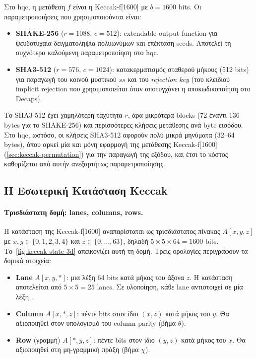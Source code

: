 Στο \gls{hqc}, η μετάθεση $f$ είναι η Keccak-f[1600] με $b = \num{1600}$ bits.
Οι παραμετροποιήσεις που χρησιμοποιούνται είναι:
\begin{itemize}
  \item \textbf{SHAKE-256} ($r = \num{1088}$, $c = 512$): extendable-output
    function για ψευδοτυχαία δειγματοληψία πολυωνύμων και επέκταση seeds.
    Αποτελεί τη συχνότερα καλούμενη παραμετροποίηση στο \gls{hqc}.
  \item \textbf{SHA3-512} ($r = 576$, $c = \num{1024}$): κατακερματισμός σταθερού μήκους
    (\num{512} bits) για παραγωγή του κοινού μυστικού $ss$ και του \emph{rejection key} (του κλειδιού implicit rejection που χρησιμοποιείται όταν αποτυγχάνει η αποκωδικοποίηση στο Decaps).
\end{itemize}
Το SHA3-512 έχει χαμηλότερη ταχύτητα $r$, άρα μικρότερα blocks (\num{72} έναντι
\num{136} bytes για το SHAKE-256) και περισσότερες κλήσεις μετάθεσης ανά byte
εισόδου. Στο \gls{hqc}, ωστόσο, οι κλήσεις SHA3-512 αφορούν πολύ μικρά μηνύματα
(\numrange{32}{64} bytes), όπου αρκεί μία και μόνη εφαρμογή
της μετάθεσης Keccak-f[1600] (\cref{sec:keccak-permutation}) για την παραγωγή της εξόδου, και
έτσι το κόστος καθορίζεται από αυτήν ανεξαρτήτως παραμετροποίησης.


\subsection{Η Εσωτερική Κατάσταση Keccak}
\label{sec:keccak-state}

\paragraph{Τρισδιάστατη δομή: lanes, columns, rows.}
Η κατάσταση της Keccak-f[1600] αναπαρίσταται ως τρισδιάστατος πίνακας
$A[x, y, z]$ με $x, y \in \{0, 1, 2, 3, 4\}$ και $z \in \{0, \ldots, 63\}$,
δηλαδή $5 \times 5 \times 64 = \num{1600}$ bits.
Το~\cref{fig:keccak-state-3d} απεικονίζει αυτή τη δομή.
Τρεις ορολογίες περιγράφουν τα δομικά στοιχεία:
\begin{itemize}
  \item \textbf{Lane} $A[x, y, *]$: μια λέξη 64 bits κατά μήκος του άξονα $z$.
    Η κατάσταση αποτελείται από $5 \times 5 = 25$ lanes.
    Σε υλοποίηση, κάθε lane αντιστοιχεί σε μία λέξη .
  \item \textbf{Column} $A[x, *, z]$: πέντε bits στον ίδιο $(x, z)$ κατά μήκος
    του $y$. Θα αξιοποιηθεί στον υπολογισμό του column parity (βήμα $\theta$).
  \item \textbf{Row} (γραμμή) $A[*, y, z]$: πέντε bits στον ίδιο $(y, z)$
    κατά μήκος του $x$. Θα αξιοποιηθεί στη μη-γραμμική πράξη (βήμα $\chi$).
\end{itemize}

